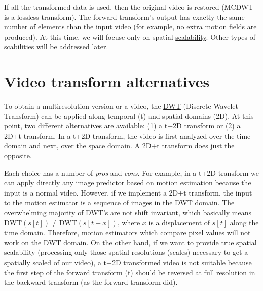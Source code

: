 If all the transformed data is used, then the original video is restored
(MCDWT is a lossless transform). The forward transform's output has
exactly the same number of elements than the input video (for example,
no extra motion fields are produced). At this time, we will focuse only
on spatial
\href{http://inst.eecs.berkeley.edu/~ee290t/sp04/lectures/videowavelet_UCB1-3.pdf}{scalability}.
Other types of scabilities will be addressed later.

\section{Video transform alternatives}
To obtain a multiresolution version or a video, the
\href{https://en.wikipedia.org/wiki/Discrete_wavelet_transform}{DWT}
(Discrete Wavelet Transform) can be applied along temporal (t) and
spatial domains (2D). At this point, two different alternatives are
available: (1) a t+2D transform or (2) a 2D+t transform. In a t+2D
transform, the video is first analyzed over the time domain and next,
over the space domain. A 2D+t transform does just the opposite.

Each choice has a number of \emph{pros} and \emph{cons}. For example, in
a t+2D transform we can apply directly any image predictor based on
motion estimation because the input is a normal video. However, if we
implement a 2D+t transform, the input to the motion estimator is a
sequence of images in the DWT domain.
\href{http://www.polyvalens.com/blog/wavelets/theory}{The overwhelming
majority of DWT's} are not
\href{http://www.polyvalens.com/blog/wavelets/theory}{shift invariant},
which basically means $\text{DWT}(s[t]) \neq \text{DWT}(s[t+x])$,
where $x$ is a displacement of $s[t]$ along the time domain.
Therefore, motion estimators which compare pixel values will not work on
the DWT domain. On the other hand, if we want to provide true spatial
scalability (processing only those spatial resolutions (scales)
necessary to get a spatially scaled of our video), a t+2D transformed
video is not suitable because the first step of the forward transform
(t) should be reversed at full resolution in the backward transform (as
the forward transform did).


